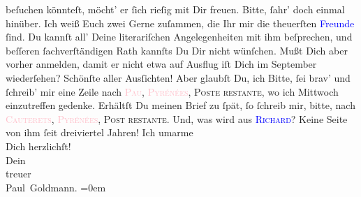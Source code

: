                beſuchen könnteſt, möcht’ er ſich rieſig mit Dir freuen. Bitte, ſahr’ doch einmal
               hinüber. Ich weiß Euch zwei Gerne zuſammen, die Ihr mir die theuerſten \textcolor{blue}{Freunde}{} ſind. Du kannſt all’
               Deine literariſchen Angelegenheiten mit ihm beſprechen, und beſſeren ſachverſtändigen
               Rath kannſts Du Dir {\pb}nicht wünſchen. Mußt Dich aber
               vorher anmelden, damit er nicht etwa auf Ausflug iſt{\dotsfour}\pend
           \pstart
           Dich im September wiederſehen? Schönſte aller Ausſichten!
               Aber glaubſt Du, ich \label{K_L02701-4v}\label{K_L02701-4h}{ }{\dotsfour}\pend
           \pstart
           Bitte, ſei brav’ und ſchreib’ mir eine Zeile nach \textsc{\textcolor{pink}{Pau}{}\ledrightnote{\textcolor{pink}{Pau}}}, \textsc{\textcolor{pink}{Pyrénées}{}\ledrightnote{\textcolor{pink}{Pyrenees}}}, \textsc{Poste restante}, wo ich Mittwoch einzutreffen gedenke. Erhältſt Du {\pb}meinen Brief zu ſpät, ſo ſchreib mir, bitte, nach
                  \textsc{\textcolor{pink}{Cauterets}{}\ledrightnote{\textcolor{pink}{Cauterets}}}, \textsc{\strikeout{\textcolor{pink}{Pyree}{}\ledrightnote{\textcolor{pink}{Pyrenees}}}}{ }\textsc{\textcolor{pink}{Pyrénées}{}\ledrightnote{\textcolor{pink}{Pyrenees}}}, \textsc{Post restante}.\pend
           \pstart
           Und, was wird aus \textsc{\textcolor{blue}{Richard}{}\ledrightnote{\textcolor{blue}{Richard Beer-Hofmann}}}? Keine Seite von ihm ſeit dreiviertel Jahren!\pend
           \pstart
           Ich umarme {\\[\baselineskip]}Dich herzlichſt! {\\[\baselineskip]}Dein {\\[\baselineskip]}treuer {\\[\baselineskip]}\spacefill\mbox{Paul Goldmann.}\pend
           \leftskip=0em{}\endnumbering{}\begin{anhang}\end{anhang}
      